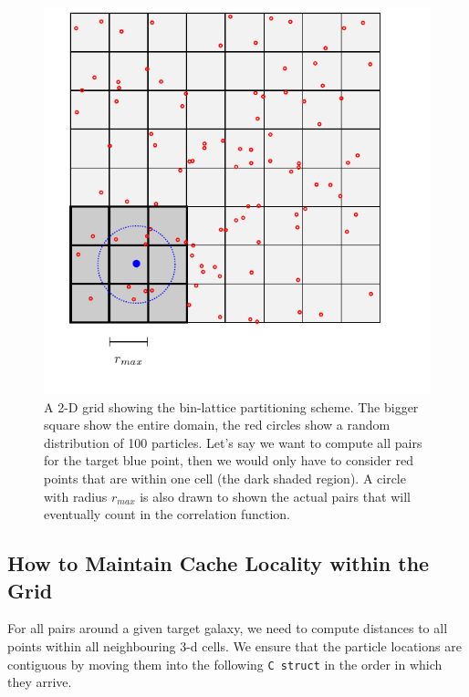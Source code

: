 \documentclass[preprint,authoryear,12pt]{elsarticle}
\newcommand{\rmax}{\ensuremath{{r_{max}}}\xspace}
\begin{document}
\begin{figure}[htbp]
\centering
\includegraphics[clip=true]{tikz_grid}
\caption{A 2-D grid showing the bin-lattice partitioning scheme. The bigger square show the entire 
domain, the red circles show a random distribution of 100 particles. Let's say we want to compute all pairs 
for the target blue point, then we would only have to consider red points that are within one cell (the dark shaded region). 
A circle with radius \rmax is also drawn to shown the actual pairs that will eventually count in the correlation function.} 
\end{figure}


\subsection{How to Maintain Cache Locality within the Grid}
For all pairs around a given target galaxy, we need to compute distances to all points within all neighbouring 3-d cells. 
We ensure that the particle locations are contiguous by moving them into the following \texttt{C struct} in the order in which they arrive. 

\end{document}
